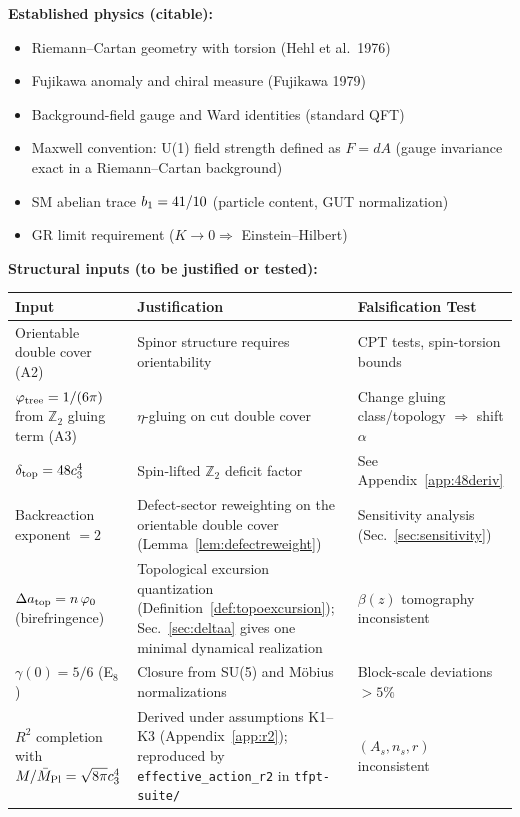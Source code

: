 \vspace{0.5em}
\begin{tcolorbox}[colback=yellow!5, colframe=yellow!60!black, 
    title={\textbf{Assumption Ledger: Established vs.\ New}}, fonttitle=\bfseries]

\textbf{Established physics (citable):}
\begin{itemize}[leftmargin=1.5em, topsep=2pt, itemsep=1pt]
    \item Riemann--Cartan geometry with torsion (Hehl et al.~1976)
    \item Fujikawa anomaly and chiral measure (Fujikawa 1979)
    \item Background-field gauge and Ward identities (standard QFT)
    \item Maxwell convention: U(1) field strength defined as $F=dA$ (gauge invariance exact in a Riemann--Cartan background)
    \item SM abelian trace $b_1 = 41/10$ (particle content, GUT normalization)
    \item GR limit requirement ($K \to 0 \Rightarrow$ Einstein--Hilbert)
\end{itemize}

\textbf{Structural inputs (to be justified or tested):}
\begin{center}
\begin{tabular}{@{}p{4cm}p{4cm}p{4.5cm}@{}}
\toprule
\textbf{Input} & \textbf{Justification} & \textbf{Falsification Test}\\
\midrule
Orientable double cover (A2) & Spinor structure requires orientability & CPT tests, spin-torsion bounds\\
$\varphi_{\mathrm{tree}} = 1/(6\pi)$ from $\mathbb{Z}_2$ gluing term (A3) & $\eta$-gluing on cut double cover & Change gluing class/topology $\Rightarrow$ shift $\alpha$\\
$\delta_{\mathrm{top}} = 48c_3^4$ & Spin-lifted $\mathbb{Z}_2$ deficit factor & See Appendix~\ref{app:48deriv}\\
Backreaction exponent $=2$ & Defect-sector reweighting on the orientable double cover (Lemma~\ref{lem:defectreweight}) & Sensitivity analysis (Sec.~\ref{sec:sensitivity})\\
$\Delta a_{\text{top}} = n\,\varphi_0$ (birefringence) & Topological excursion quantization (Definition~\ref{def:topoexcursion}); Sec.~\ref{sec:deltaa} gives one minimal dynamical realization & $\beta(z)$ tomography inconsistent\\
$\gamma(0) = 5/6$ (E$_8$) & Closure from SU(5) and M\"obius normalizations & Block-scale deviations $>5\%$\\
$R^2$ completion with $M/\bar{M}_{\mathrm{Pl}}=\sqrt{8\pi}c_3^4$ & Derived under assumptions K1--K3 (Appendix~\ref{app:r2}); reproduced by \texttt{effective\_action\_r2} in \texttt{tfpt-suite/} & $(A_s,n_s,r)$ inconsistent\\
\bottomrule
\end{tabular}
\end{center}


\end{tcolorbox}
